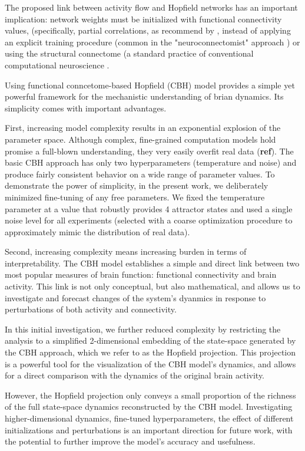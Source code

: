 \documentclass{article}
\begin{document}
The proposed link between activity flow and Hopfield networks has an important implication: network weights must be
initialized with functional connectivity values, (specifically, partial correlations, as recommend by
\citep{cole2016activity}, instead of applying an explicit training procedure (common in the "neuroconnectomist"
approach \citep{doerig2023neuroconnectionist}) or using the structural connectome (a standard practice of conventional
computational neuroscience \citep{cabral2017functional}.

Using functional conncetome-based Hopfield (CBH) model provides a simple yet powerful framework for the mechanistic
understanding of brian dynamics. Its simplicity comes with important advantages.

First, increasing model complexity results in an exponential explosion of the parameter space. Although complex,
fine-grained computation models hold promise a full-blown understanding, they very easily overfit real data (\textbf{ref}).
The basic CBH approach has only two hyperparameters (temperature and noise) and produce fairly consistent behavior on a
wide range of parameter values. To demonstrate the power of simplicity, in the present work, we deliberately minimized
fine-tuning of any free parameters. We fixed the temperature parameter at a value that robustly provides 4 attractor
states and used a single noise level for all experiments (selected with a coarse optimization procedure to approximately
mimic the distribution of real data).

Second, increasing complexity means increasing burden in terms of interpretability. The CBH model establishes a simple
and direct link between two most popular measures of brain function: functional connectivity and brain activity. This
link is not only conceptual, but also mathematical, and allows us to investigate and forecast changes of the system's
dyanmics in response to perturbations of both activity and connectivity.

In this initial investigation, we further reduced complexity by restricting the analysis to a simplified 2-dimensional
embedding of the state-space generated by the CBH approach, which we refer to as the Hopfield projection. This
projection is a powerful tool for the visualization of the CBH model's dynamics, and allows for a direct comparison
with the dynamics of the original brain activity.

However, the Hopfield projection only conveys a small proportion of the richness of the full state-space dynamics
reconstructed by the CBH model. Investigating higher-dimensional dynamics, fine-tuned hyperparameters, the effect of
different initializations and perturbations is an important direction for future work, with the potential to further
improve the model's accuracy and usefulness.
\end{document}
